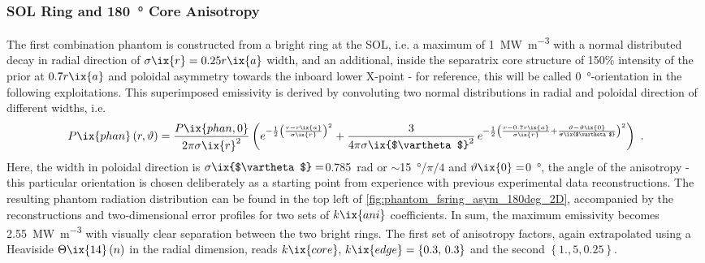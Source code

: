             \subsubsection*{SOL Ring and \SI{180}{\degree} Core Anisotropy}%
%
                The first combination phantom is constructed from a bright ring at the SOL, i.e. a maximum of \SI{1}{\mega\watt\per\cubic\meter} with a normal distributed decay in radial direction of $\sigma\ix{r}=0.25r\ix{a}$ width, and an additional, inside the separatrix core structure of 150\% intensity of the prior at $0.7r\ix{a}$ and poloidal asymmetry towards the inboard lower X-point - for reference, this will be called \SI{0}{\degree}-orientation in the following exploitations. This superimposed emissivity is derived by convoluting two normal distributions in radial and poloidal direction of different widths, i.e.%
%
                \begin{align}%
                    P\ix{phan}\left(r,\vartheta\right)=%
                    \frac{P\ix{phan,0}}{2\pi\sigma\ix{r}^{2}}\left(%
                    e^{-\frac{1}{2}\left(\frac{r-r\ix{a}}{\sigma\ix{r}}\right)^{2}}+%
                    \frac{3}{4\pi\sigma\ix{$\vartheta$}^{2}}\,e^{-\frac{1}{2}\left(\frac{r-0.7r\ix{a}}{\sigma\ix{r}}+\frac{\vartheta-\vartheta\ix{0}}{\sigma\ix{$\vartheta$}}\right)^{2}}%
                    \right)\,\,.\label{eq:fsring_asym_single_deg}%
                \end{align}%
%
                Here, the width in poloidal direction is $\sigma\ix{$\vartheta$}=$\SI{0.785}{\radian} or $\sim$\SI{15}{\degree}/$
                \pi/4$ and $\vartheta\ix{0}=$\SI{0}{\degree}, the angle of the anisotropy - this particular orientation is chosen deliberately as a starting point from experience with previous experimental data reconstructions. The resulting phantom radiation distribution can be found in the top left of \cref{fig:phantom_fsring_asym_180deg_2D}, accompanied by the reconstructions and two-dimensional error profiles for two sets of $k\ix{ani}$ coefficients. In sum, the maximum emissivity becomes \SI{2.55}{\mega\watt\per\cubic\meter} with visually clear separation between the two bright rings. The first set of anisotropy factors, again extrapolated using a Heaviside $\Theta\ix{14}\left(n\right)$ in the radial dimension, reads $k\ix{core},\,k\ix{edge}=\left\{0.3,\,0.3\right\}$ and the second $\left\{1.,5, 0.25\right\}$.\\%
%
